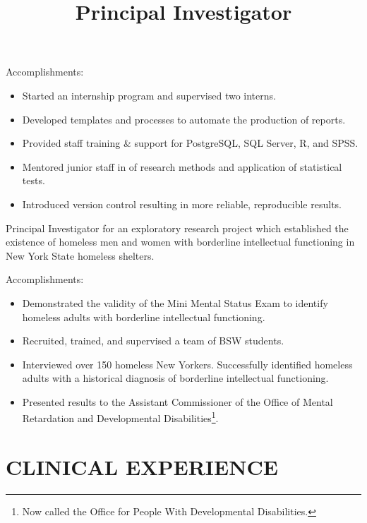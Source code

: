 \documentclass[line, margin, 10pt]{res}
\begin{document}
\begin{resume}
\begin{position}
    Accomplishments:
    \begin{itemize}
    \item Started an internship program and supervised two interns.
    \item Developed templates and processes to automate the production
      of reports.
    \item Provided staff training \& support for PostgreSQL, SQL
      Server, R, and SPSS.
    \item Mentored junior staff in of research methods and application
      of statistical tests.
    \item Introduced version control resulting in more reliable, reproducible results.
    \end{itemize}
  \end{position}

  \title{Principal Investigator}
  \begin{position}
    Principal Investigator for an exploratory research project which
    established the existence of homeless men and women with
    borderline intellectual functioning in New York State homeless
    shelters.

    Accomplishments:
    \begin{itemize}
    \item Demonstrated the validity of the Mini Mental Status Exam to
      identify homeless adults with borderline intellectual functioning.
    \item Recruited, trained, and supervised a team of BSW students.
    \item Interviewed over 150 homeless New Yorkers. Successfully
      identified homeless adults with a historical diagnosis of
      borderline intellectual functioning.
    \item Presented results to the Assistant Commissioner
      of the Office of Mental Retardation and Developmental
      Disabilities\footnote{Now called the Office for People With
        Developmental Disabilities.}.
    \end{itemize}
  \end{position}


  \section{CLINICAL EXPERIENCE}


\end{resume}
\end{document}
